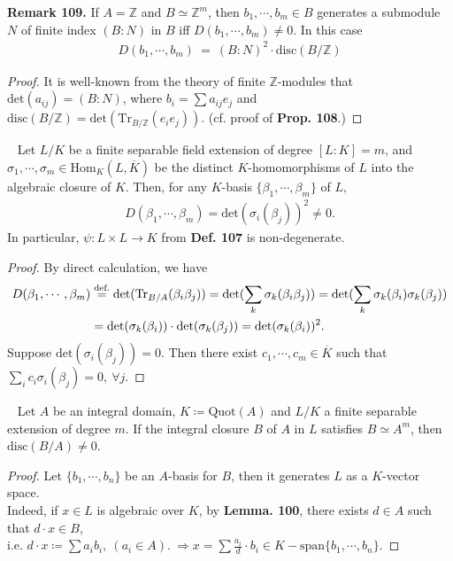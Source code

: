 \documentclass[12pt,a4paper,footinclude=true,headinclude=true]{scrbook} %
\newcommand\myeq[1]{\stackrel{\textnormal{#1}}{=}}
\newenvironment{proposition}[2][]
{\renewcommand\theinnercustomprop{#2}\innercustomprop[#1] 
\begin{mdframed}[backgroundcolor=gray!20]\ }
{\end{mdframed}\endinnercustomprop}
\newenvironment{corollary}[2][]
{\renewcommand\theinnercustomcol{#2}\innercustomcol[#1]
\begin{mdframed}[backgroundcolor=gray!20]\ }
{\end{mdframed}\endinnercustomcol}
\newenvironment{remark}[2][Remark]
    { \begin{mdframed}[backgroundcolor=gray!20] \textbf{#1 #2.} }
    {  \end{mdframed}}
\begin{document}
\begin{remark}{109}
    If $A=\mathbb{Z}$ and $B\simeq\mathbb{Z}^m$, then $b_1,\cdots,b_m\in B$ generates a submodule $N$ of finite index $(B:N)$ in $B$ iff $D(b_1,\cdots,b_m)\neq0$. In this case
    \begin{align*}
        D(b_1,\cdots,b_m)\ =\ (B:N)^2\cdot\mathrm{disc}(B/ \mathbb{Z})
    \end{align*}
\end{remark}
\begin{proof}
    It is well-known from the theory of finite $\mathbb{Z}$-modules that $\mathrm{det}(a_{ij})=(B:N)$, where $b_i=\sum a_{ij}e_j$ and $\mathrm{disc}(B/\mathbb{Z})=\mathrm{det}(\mathrm{Tr}_{B/\mathbb{Z}}(e_ie_j))$. (cf. proof of \textbf{Prop. 108}.)
\end{proof}
\newpage
\begin{proposition}{110}
    Let $L/K$ be a finite separable field extension of degree $[L:K]=m$, and $\sigma_1,\cdots,\sigma_m\in\mathrm{Hom}_K(L,\overline{K})$ be the distinct $K$-homomorphisms of $L$ into the algebraic closure of $K$. Then, for any $K$-basis $\{\beta_1,\cdots,\beta_m\}$ of $L$, 
    \begin{align*}
        D(\beta_1,\cdots,\beta_m) =\mathrm{det}(\sigma_i(\beta_j))^2\neq0.
    \end{align*}
    In particular, $\psi:L\times L\to K$ from \textbf{Def. 107} is non-degenerate.
\end{proposition}
\begin{proof}
    By direct calculation, we have 
    \begin{align*}
        D(\beta_1,\cdots,\beta_m) &\myeq{def.} \mathrm{det} (\mathrm{Tr}_{B/A}(\beta_i\beta_j)) 
        =\mathrm{det}(\sum_k\sigma_k(\beta_i\beta_j))
        =\mathrm{det}(\sum_k\sigma_k(\beta_i)\sigma_k(\beta_j)) \\
        & =\mathrm{det}(\sigma_k(\beta_i))\cdot\mathrm{det}(\sigma_k(\beta_j)) =\mathrm{det}(\sigma_k(\beta_i))^2.
    \end{align*}
    Suppose $\mathrm{det}(\sigma_i(\beta_j))=0$. Then there exist $c_1,\cdots,c_m\in\overline{K}$ such that $\sum_ic_i\sigma_i(\beta_j) =0,\ \forall j$.
\end{proof}

\begin{corollary}{111}
    Let $A$ be an integral domain, $K\coloneqq\mathrm{Quot}(A)$ and $L/K$ a finite separable extension of degree $m$. If the integral closure $B$ of $A$ in $L$ satisfies $B\simeq A^m$, then $\mathrm{disc}(B/A)\neq0$.
\end{corollary}
\begin{proof}
    Let $\{b_1,\cdots,b_n\}$ be an $A$-basis for $B$, then it generates $L$ as a $K$-vector space.\\ Indeed, if $x\in L$ is algebraic over $K$, by \textbf{Lemma. 100}, there exists $d\in A$ such that $d\cdot x\in B$,\\ i.e. $d\cdot x\coloneqq\sum a_ib_i,\ (a_i\in A).\ \Rightarrow x=\sum \frac{a_i}{d}\cdot b_i\in K-\mathrm{span}\{b_1,\cdots,b_n\}$.
\end{proof}
\end{document}
